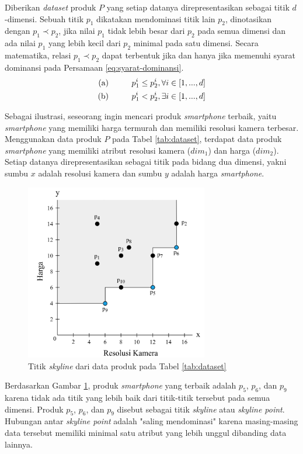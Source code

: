 Diberikan \textit{dataset} produk $P$ yang setiap datanya direpresentasikan sebagai titik $d$-dimensi. Sebuah titik $p_1$ dikatakan mendominasi titik lain $p_2$, dinotasikan dengan  $p_1 \prec p_2$, jika nilai $p_1$ tidak lebih besar dari $p_2$ pada semua dimensi dan ada nilai $p_1$ yang lebih kecil dari $p_2$ minimal pada satu dimensi. Secara matematika, relasi $p_1 \prec p_2$ dapat terbentuk jika dan hanya jika memenuhi syarat dominansi pada Persamaan \ref{eq:syarat-dominansi}.
\begin{equation}\label{eq:syarat-dominansi}
\begin{split}
\text{(a)} \hspace*{1cm} p_1^i \leq p_2^i, \forall i \in [1, ..., d] \\
\text{(b)} \hspace*{1cm} p_1^i < p_2^i, \exists i \in [1, ..., d]
\end{split}
\end{equation}

Sebagai ilustrasi, seseorang ingin mencari produk \textit{smartphone} terbaik, yaitu \textit{smartphone} yang memiliki harga termurah dan memiliki resolusi kamera terbesar. Menggunakan data produk $P$ pada Tabel \ref{tab:dataset}, terdapat data produk \textit{smartphone} yang memiliki atribut resolusi kamera ($dim_1$) dan harga ($dim_2$). Setiap datanya direpresentasikan sebagai titik pada bidang dua dimensi, yakni sumbu $x$ adalah resolusi kamera dan sumbu $y$ adalah harga \textit{smartphone}.

\begin{figure}[h]
	\centering
	\includegraphics[width=8cm]{assets/img/bab2/skyline.png}
	\caption{Titik \textit{skyline} dari data produk pada Tabel \ref{tab:dataset}}
	\label{fig:skyline}
\end{figure}

Berdasarkan Gambar \ref{fig:skyline}, produk \textit{smartphone} yang terbaik adalah $p_5$, $p_6$, dan $p_9$ karena tidak ada titik yang lebih baik dari titik-titik tersebut pada semua dimensi. Produk $p_5$, $p_6$, dan $p_9$ disebut sebagai titik \textit{skyline} atau \textit{skyline point}. Hubungan antar \textit{skyline point} adalah "saling mendominasi" karena masing-masing data tersebut memiliki minimal satu atribut yang lebih unggul dibanding data lainnya.

